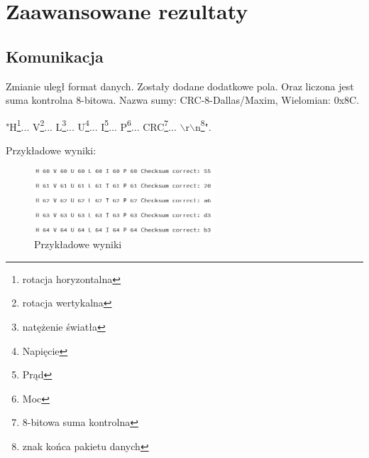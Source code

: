 \documentclass[10pt, a4paper]{article}
\begin{document}
\section{Zaawansowane rezultaty}
	\subsection{Komunikacja}
	Zmianie uległ format danych. Zostały dodane dodatkowe pola. Oraz liczona jest suma kontrolna 8-bitowa. Nazwa sumy: CRC-8-Dallas/Maxim, Wielomian: 0x8C.
		\begin{center}
			"H\footnote{rotacja horyzontalna}... V\footnote{rotacja wertykalna}... L\footnote{natężenie światła}... U\footnote{Napięcie}... I\footnote{Prąd}... P\footnote{Moc}... CRC\footnote{8-bitowa suma kontrolna}... $\backslash$r$\backslash$n\footnote{znak końca pakietu danych}".
		\end{center}
	Przykładowe wyniki:
		\begin{figure}[H]
			\centering
			\includegraphics[width=0.6\textwidth]{figures/serial_wyniki.png}
			\caption{Przykładowe wyniki}
			\label{fig:serial_wyniki}
		\end{figure}
	
\end{document}
